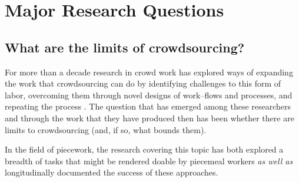 \documentclass[trackingWork]{subfiles}
\begin{document}

\section{Major Research Questions}


\subsection{What are the limits of crowdsourcing?}
For more than a decade
research in crowd work has explored ways of expanding the work that crowdsourcing can do by
  identifying challenges to this form of labor,
  overcoming them through novel designs of work--flows and processes,
and repeating the process
\cite{bernsteinSoylent}.
The question that has emerged
among these researchers and
through the work that they have produced then
has been whether there are limits to crowdsourcing
(and, if so, what bounds them).

In the field of piecework,
the research covering this topic has both explored
a breadth of tasks that might be rendered doable by piecemeal workers
\textit{as well as} longitudinally documented the success of these approaches.
\end{document}
